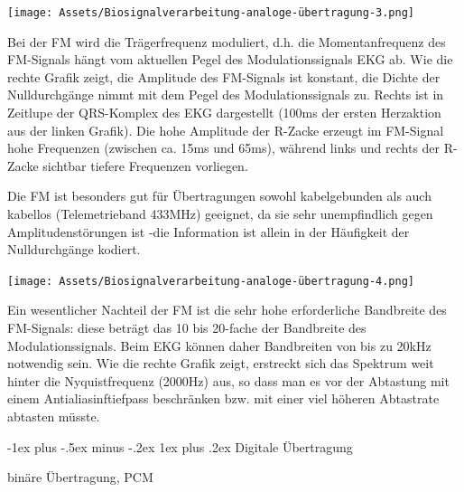 \documentclass[a4paper]{article}
\makeatletter
\renewcommand{\subsubsection}{\@startsection{subsubsection}{3}{0mm}%
 {-1ex plus -.5ex minus -.2ex}%
 {1ex plus .2ex}%
 {\normalfont\small\bfseries}}
\makeatother
\begin{document}
\begin{multicols}{3}
\begin{itemize*}
    \item \texttt{[image: Assets/Biosignalverarbeitung-analoge-übertragung-3.png]}
    \item Bei der FM wird die Trägerfrequenz moduliert, d.h. die Momentanfrequenz des FM-Signals hängt vom aktuellen Pegel des Modulationssignals EKG ab. Wie die rechte Grafik zeigt, die Amplitude des FM-Signals ist konstant, die Dichte der Nulldurchgänge nimmt mit dem Pegel des Modulationssignals zu. Rechts ist in Zeitlupe der QRS-Komplex des EKG dargestellt (100ms der ersten Herzaktion aus der linken Grafik). Die hohe Amplitude der R-Zacke erzeugt im FM-Signal hohe Frequenzen (zwischen ca. 15ms und 65ms), während links und rechts der R-Zacke sichtbar tiefere Frequenzen vorliegen.
    \item Die FM ist besonders gut für Übertragungen sowohl kabelgebunden als auch kabellos (Telemetrieband 433MHz) geeignet, da sie sehr unempfindlich gegen Amplitudenstörungen ist -die Information ist allein in der Häufigkeit der Nulldurchgänge kodiert.
    \item \texttt{[image: Assets/Biosignalverarbeitung-analoge-übertragung-4.png]}
    \item Ein wesentlicher Nachteil der FM ist die sehr hohe erforderliche Bandbreite des FM-Signals: diese beträgt das 10 bis 20-fache der Bandbreite des Modulationssignals. Beim EKG können daher Bandbreiten von bis zu 20kHz notwendig sein. Wie die rechte Grafik zeigt, erstreckt sich das Spektrum weit hinter die Nyquistfrequenz (2000Hz) aus, so dass man es vor der Abtastung mit einem Antialiasinftiefpass beschränken bzw. mit einer viel höheren Abtastrate abtasten müsste.
  \end{itemize*}

  \subsubsection{Digitale Übertragung}\label{digitale-uxfcbertragung}

  binäre Übertragung, PCM


\end{multicols}
\end{document}
